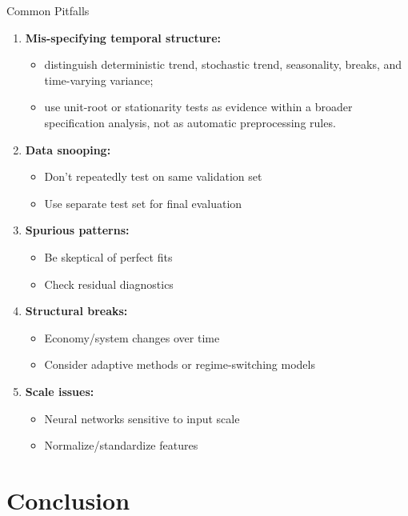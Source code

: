 \documentclass[aspectratio=169]{beamer}
\begin{document}
\begin{frame}{Common Pitfalls}
  \begin{enumerate}
    \item \textbf{Mis-specifying temporal structure:}
    \begin{itemize}
      \item distinguish deterministic trend, stochastic trend, seasonality, breaks, and time-varying variance;
      \item use unit-root or stationarity tests as evidence within a broader specification analysis, not as automatic preprocessing rules.
    \end{itemize}

    \item \textbf{Data snooping:}
    \begin{itemize}
      \item Don't repeatedly test on same validation set
      \item Use separate test set for final evaluation
    \end{itemize}

    \item \textbf{Spurious patterns:}
    \begin{itemize}
      \item Be skeptical of perfect fits
      \item Check residual diagnostics
    \end{itemize}

    \item \textbf{Structural breaks:}
    \begin{itemize}
      \item Economy/system changes over time
      \item Consider adaptive methods or regime-switching models
    \end{itemize}

    \item \textbf{Scale issues:}
    \begin{itemize}
      \item Neural networks sensitive to input scale
      \item Normalize/standardize features
    \end{itemize}
  \end{enumerate}
\end{frame}

\section{Conclusion}
\end{document}

